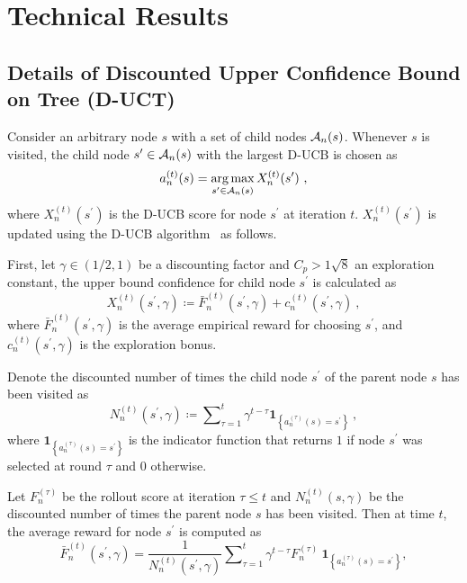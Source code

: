 \appendix

\section{Technical Results}
\label{app:A}
\subsection{Details of Discounted Upper Confidence Bound on Tree (D-UCT)}

Consider an arbitrary node $s$ with a set of child nodes $\mathcal{A}_n(s)$. Whenever $s$ is visited, the child node $s^{\prime}\in \mathcal{A}_n(s)$ with the largest D-UCB is chosen as 
\begin{equation}
    a_n^{(t)}(s) =\operatorname*{arg\,max}_{s^{\prime} \in \mathcal{A}_n(s)} X_n^{(t)}(s^{\prime})\ ,
\end{equation}
where $X_n^{(t)}(s^{\prime})$ is the D-UCB score for node $s^{\prime}$ at iteration $t$. $X_n^{(t)}(s^{\prime})$ is updated using the D-UCB algorithm~\citep{garivier2011upper} as follows. 

First, let $\gamma \in (1/2,1)$ be a discounting factor and $C_p>1\sqrt{8}$ an exploration constant, the upper bound confidence for child node $s^{\prime}$ is calculated as
\begin{equation}
     X_n^{(t)}(s^{\prime}, \gamma) \coloneqq \bar{F}_n^{(t)}(s^{\prime}, \gamma) + c_n^{(t)}(s^{\prime}, \gamma)\ ,
\end{equation}
where $\bar{F}_n^{(t)}(s^{\prime},\gamma)$ is the average empirical reward for choosing $s^\prime$, and $c_n^{(t)}(s^\prime, \gamma)$ is the exploration bonus. 

Denote the discounted number of times the child node $s^{\prime}$ of the parent node $s$ has been visited as
\begin{equation}
\label{eq:Nt}
   N_n^{(t)}(s^{\prime},\gamma) \coloneqq \sum\nolimits_{\tau=1}^t \gamma^{t-\tau} \textbf{1}_{ \left\{ a_n^{(\tau)}(s)=s^{\prime} \right\} }\ , 
\end{equation}
where $\textbf{1}_{ \left\{ a_n^{(\tau)}(s)=s^{\prime} \right\} }$ is the indicator function that returns $1$ if node $s^{\prime}$ was selected at round $\tau$ and $0$ otherwise.

Let $F_n^{(\tau)}$ be the rollout score at iteration $\tau \leq t$ and $N_n^{(t)}(s,\gamma)$ be the discounted number of times the parent node $s$ has been visited. Then at time $t$, the average reward for node $s^\prime$ is computed as
\begin{equation}
\label{eq:rollout_rewards}
\bar{F}_n^{(t)}(s^\prime,\gamma) = \frac{1}{N_n^{(t)}(s^{\prime},\gamma)} \sum\nolimits_{\tau=1}^{t} \gamma^{t-\tau}F_n^{(\tau)} \ \textbf{1}_{ \left\{ a_n^{(\tau)}(s)=s^{\prime} \right\} },
\end{equation}

